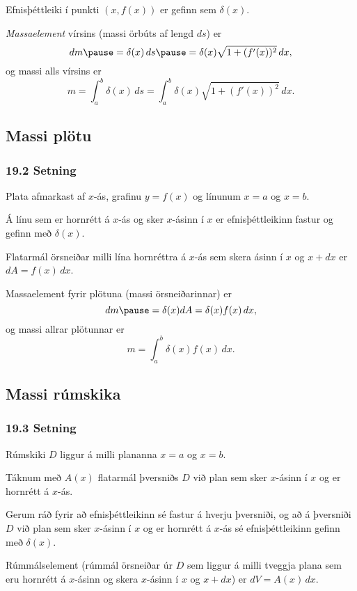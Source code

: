\noindent
Efnisþéttleiki í punkti $(x, f(x))$ er gefinn sem $\delta(x)$. \pause

\noindent
{\em Massaelement} vírsins (massi örbúts af lengd $ds$) er
$$dm \pause
= \delta(x)\, ds \pause
=\delta(x)\sqrt{1+(f'(x))^2}\, dx,$$\pause
og massi alls vírsins er
$$m=\int_a^b \delta(x)\,ds=\int_a^b \delta(x)\sqrt{1+(f'(x))^2}\, dx.$$
 


\subsection[t]{Massi plötu}
 \subsubsection{19.2 Setning}  
Plata afmarkast af $x$-ás, grafinu $y=f(x)$ og
línunum $x=a$ og $x=b$.  \pause

\noindent
Á línu sem er hornrétt á $x$-ás og sker $x$-ásinn í
$x$ er efnisþéttleikinn fastur og gefinn með $\delta(x)$. \pause 

\noindent
Flatarmál
örsneiðar milli lína hornréttra á $x$-ás sem skera ásinn í 
$x$ og $x+dx$ er $dA=f(x)\,dx$.  \pause

\noindent
Massaelement fyrir plötuna (massi örsneiðarinnar) er
$$dm \pause
=\delta(x)dA = \delta(x) f(x)\,dx,$$
\pause
og massi allrar plötunnar er
$$m=\int_a^b \delta(x)f(x)\,dx.$$
 


\subsection[t]{Massi rúmskika}
 \subsubsection{19.3 Setning} 
Rúmskiki $D$ liggur á milli plananna $x=a$ og $x=b$.  \pause

Táknum með $A(x)$ flatarmál
þversniðs $D$ við plan sem sker $x$-ásinn í $x$ og er 
hornrétt á $x$-ás. \pause

Gerum ráð fyrir að efnisþéttleikinn sé fastur á hverju þversniði,
og að á þversniði $D$ við plan sem sker $x$-ásinn í $x$ og er 
hornrétt á $x$-ás sé efnisþéttleikinn gefinn með $\delta(x)$.  \pause

Rúmmálselement \pause (rúmmál örsneiðar úr
$D$ sem liggur á milli tveggja plana sem eru hornrétt á $x$-ásinn og skera
$x$-ásinn í $x$ og $x+dx$) \pause er $dV=A(x)\, dx$.
\pause

